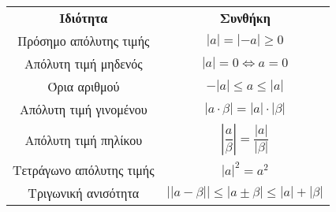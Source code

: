 \begin{longtable}{cc}
\hline \rule[-2ex]{0pt}{5.5ex} \textbf{Ιδιότητα} & \textbf{Συνθήκη} \\
\hhline{==}\rule[-2ex]{0pt}{5.5ex} Πρόσημο απόλυτης τιμής & $ |a|=|-a|\geq0 $ \\
\rule[-2ex]{0pt}{5.5ex} Απόλυτη τιμή μηδενός & $ |a|=0\Leftrightarrow a=0 $\\
\rule[-2ex]{0pt}{5.5ex}  Όρια αριθμού & $ -|a|\leq a\leq|a| $ \\
\rule[-2ex]{0pt}{5.5ex}  Απόλυτη τιμή γινομένου & $ |a\cdot\beta|=|a|\cdot|\beta| $ \\
\rule[-2ex]{0pt}{5.5ex} Απόλυτη τιμή πηλίκου & $ \left| \dfrac{a}{\beta}\right|=\dfrac{|a|}{|\beta|} $ \\
\rule[-2ex]{0pt}{5.5ex} Τετράγωνο απόλυτης τιμής & $ |a|^2=a^2 $ \\
\rule[-2ex]{0pt}{5.5ex} Τριγωνική ανισότητα & $ \left||a-\beta| \right|\leq|a\pm\beta|\leq|a|+|\beta|  $ \\
\hline
\end{longtable}
